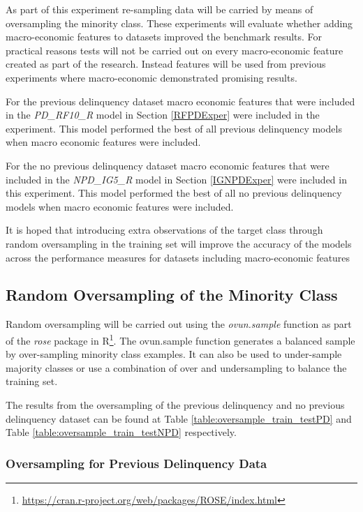 As part of this experiment re-sampling data will be carried by means of oversampling the minority class. These experiments will evaluate whether adding macro-economic features to datasets improved the benchmark results. For practical reasons tests will not be carried out on every macro-economic feature created as part of the research. Instead features will be used from previous experiments where macro-economic demonstrated promising results. 

For the previous delinquency dataset macro economic features that were included in the \textit{PD\_RF10\_R} model in Section \ref{RFPDExper} were included in the experiment. This model performed the best of all previous delinquency models when macro economic features were included.

For the no previous delinquency dataset macro economic features that were included in the \textit{NPD\_IG5\_R} model in Section \ref{IGNPDExper} were included in this experiment. This model performed the best of all no previous delinquency models when macro economic features were included. 

It is hoped that introducing extra observations of the target class through random oversampling in the training set will improve the accuracy of the models across the performance measures for datasets including macro-economic features




\subsection{Random Oversampling of the Minority Class}
Random oversampling will be carried out using the \textit{ovun.sample} function as part of the \textit{rose} package in R\footnote{\url{https://cran.r-project.org/web/packages/ROSE/index.html}}. The ovun.sample function generates a balanced sample by over-sampling minority class examples. It can also be used to under-sample majority classes or use a combination of over and undersampling to balance the training set.

The results from the oversampling of the previous delinquency and no previous delinquency dataset can be found at Table \ref{table:oversample_train_testPD} and Table \ref{table:oversample_train_testNPD} respectively.

\subsubsection{Oversampling for Previous Delinquency Data}

